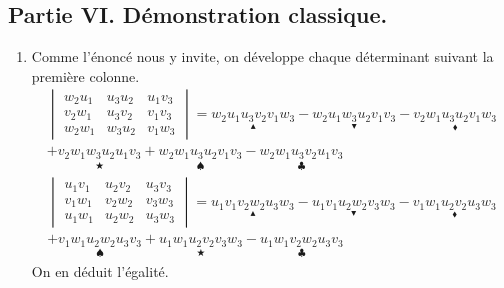 \subsection*{Partie VI. Démonstration classique.}
\begin{enumerate}
 \item Comme l'énoncé nous y invite, on développe chaque déterminant suivant la première colonne.
\begin{multline*}
  \begin{vmatrix}
  w_2u_1 & u_3u_2 & u_1v_3 \\
  v_2w_1 & u_3v_2 & v_1v_3 \\
  w_2w_1 & w_3u_2 & v_1w_3
 \end{vmatrix}
=
\underset{\blacktriangle}{w_2u_1u_3v_2v_1w_3} 
-\underset{\blacktriangledown}{w_2u_1w_3u_2v_1v_3}
 -\underset{\blacklozenge}{v_2w_1u_3u_2v_1w_3} \\
+\underset{\bigstar}{v_2w_1w_3u_2u_1v_3}
 +\underset{\spadesuit}{w_2w_1u_3u_2v_1v_3}
- \underset{\clubsuit}{w_2w_1u_3v_2u_1v_3}
\end{multline*}
\begin{multline*}
 \begin{vmatrix}
 u_1v_1 & u_2v_2 & u_3v_3 \\
 v_1w_1 & v_2w_2 & v_3w_3 \\
 u_1w_1 & u_2w_2 & u_3w_3
\end{vmatrix}
= \underset{\blacktriangle}{u_1v_1v_2w_2u_3w_3}
-\underset{\blacktriangledown}{u_1v_1u_2w_2v_3w_3}
-\underset{\blacklozenge}{v_1w_1u_2v_2u_3w_3}\\
+\underset{\spadesuit}{v_1w_1u_2w_2u_3v_3}
+\underset{\bigstar}{u_1w_1u_2v_2v_3w_3}
-\underset{\clubsuit}{u_1w_1v_2w_2u_3v_3}
\end{multline*}
On en déduit l'égalité.


\end{enumerate}
